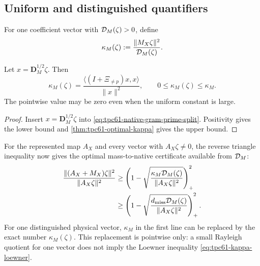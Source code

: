 \subsection{Uniform and distinguished quantifiers}

For one coefficient vector with \(\mathcal D_M(\zeta)>0\), define
\begin{equation}
 \kappa_M(\zeta)
 :=\frac{\|M_X\zeta\|^2}{\mathcal D_M(\zeta)}.
 \label{eq:tpc61-pointwise-kappa}
\end{equation}

\begin{proposition}
\label{prop:tpc61-pointwise-rayleigh}
Let \(x=\mathbf D_M^{1/2}\zeta\).  Then
\begin{equation}
 \boxed{
 \kappa_M(\zeta)
 =\frac{\langle(I+\Xi_{\ne p})x,x\rangle}{\|x\|^2},
 \qquad
 0\le\kappa_M(\zeta)\le\kappa_M.}
 \label{eq:tpc61-pointwise-rayleigh}
\end{equation}
The pointwise value may be zero even when the uniform constant is large.
\end{proposition}

\begin{proof}
Insert \(x=\mathbf D_M^{1/2}\zeta\) into
\eqref{eq:tpc61-native-gram-prime-split}.  Positivity gives the lower
bound and \cref{thm:tpc61-optimal-kappa} gives the upper bound.
\end{proof}

For the represented map \(A_X\) and every vector with
\(A_X\zeta\ne0\), the reverse triangle inequality now gives the optimal
mass-to-native certificate available from \(\mathcal D_M\):
\begin{align}
 \frac{\|(A_X+M_X)\zeta\|^2}{\|A_X\zeta\|^2}
 &\ge
 \left(
  1-\sqrt{
   \frac{\kappa_M\mathcal D_M(\zeta)}
        {\|A_X\zeta\|^2}}
 \right)_+^2
 \label{eq:tpc61-uniform-reassembly-certificate}\\
 &\ge
 \left(
  1-\sqrt{
   \frac{d_{\rm miss}\mathcal D_M(\zeta)}
        {\|A_X\zeta\|^2}}
 \right)_+^2.
 \notag
\end{align}
For one distinguished physical vector, \(\kappa_M\) in the first line can
be replaced by the exact number \(\kappa_M(\zeta)\).  This replacement is
pointwise only: a small Rayleigh quotient for one vector does not imply the
Loewner inequality \eqref{eq:tpc61-kappa-loewner}.
